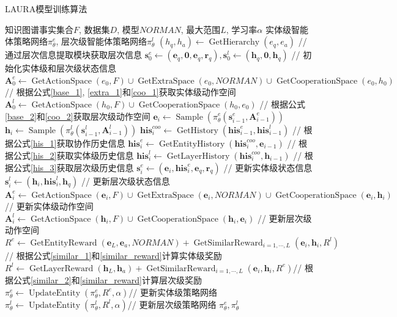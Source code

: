 \documentclass[algorithmlist, AutoFakeBold, AutoFakeSlant, figurelist, tablelist, nomlist, engineering]{seuthesix}
\begin{document}
\begin{algorithm}[H]
	\caption{LAURA模型训练算法}  
	\label{algorithm_dualagent}
	\begin{algorithmic}[1]
  \Require 知识图谱事实集合$F$, 数据集$D$, 模型$NORMAN$, 最大范围$L$, 学习率$\alpha$
  \Ensure 实体级智能体策略网络$\pi_\theta^e$, 层次级智能体策略网络$\pi_\theta^l$
  \State $(h_q, h_a) \leftarrow \operatorname{GetHierarchy}(e_q, e_a)$ // 通过层次信息提取模块获取层次信息
  \State $\bm{s}_{0}^{e} \leftarrow (\bm{e}_q, \bm{0}, \bm{e}_q, \bm{r}_q), \bm{s}_{0}^{l} \leftarrow (\bm{h}_q, \bm{0}, \bm{h}_q)$ // 初始化实体级和层次级状态信息
  \State $\bm{A}_{0}^{e} \leftarrow \operatorname{GetActionSpace}(e_0, F) \cup \operatorname{GetExtraSpace}(e_0, NORMAN) \cup \operatorname{GetCooperationSpace}(e_0, h_0)$ // 根据公式\ref{base_1}, \ref{extra_1}和\ref{coo_1}获取实体级动作空间
  \State $\bm{A}_{0}^{l} \leftarrow \operatorname{GetActionSpace}(h_0, F) \cup \operatorname{GetCooperationSpace}(h_0, e_0)$ // 根据公式\ref{base_2}和\ref{coo_2}获取层次级动作空间
  \State $\bm{e}_i \leftarrow \operatorname{Sample}(\pi_\theta^e(\bm{s}_{i-1}^{e}, \bm{A}_{i-1}^{e}))$
  \State $\bm{h}_i \leftarrow \operatorname{Sample}(\pi_\theta^l(\bm{s}_{i-1}^{l}, \bm{A}_{i-1}^{l}))$
  \State $\bm{his}_{i}^{coo} \leftarrow \operatorname{GetHistory}(\bm{his}_{i-1}^{e}, \bm{his}_{i-1}^{l})$ // 根据公式\ref{his_1}获取协作历史信息
  \State $\bm{his}_{i}^{e} \leftarrow \operatorname{GetEntityHistory}(\bm{his}_{i}^{coo}, \bm{e}_{i-1})$ // 根据公式\ref{his_2}获取实体级历史信息
  \State $\bm{his}_{i}^{l} \leftarrow \operatorname{GetLayerHistory}(\bm{his}_{i}^{coo}, \bm{h}_{i-1})$ // 根据公式\ref{his_3}获取层次级历史信息
  \State $\bm{s}_{i}^{e} \leftarrow (\bm{e}_{i}, \bm{his}_{i}^{e}, \bm{e}_q, \bm{r}_q)$ // 更新实体级状态信息
  \State $\bm{s}_{i}^{l} \leftarrow (\bm{h}_{i}, \bm{his}_{i}^{l}, \bm{h}_q)$ // 更新层次级状态信息
  \State $\bm{A}_{i}^{e} \leftarrow \operatorname{GetActionSpace}(\bm{e}_i, F) \cup \operatorname{GetExtraSpace}(\bm{e}_i, NORMAN) \cup \operatorname{GetCooperationSpace}(\bm{e}_i, \bm{h}_i)$ // 更新实体级动作空间
  \State $\bm{A}_{i}^{l} \leftarrow \operatorname{GetActionSpace}(\bm{h}_i, F) \cup \operatorname{GetCooperationSpace}(\bm{h}_i, \bm{e}_i)$ // 更新层次级动作空间
  \EndFor
  \State $R^{e} \leftarrow \operatorname{GetEntityReward}(\bm{e}_L, \bm{e}_a, NORMAN) + \operatorname{GetSimilarReward}_{i=1,\cdots,L}(\bm{e}_i, \bm{h}_i, R^{l})$// 根据公式\ref{similar_1}和\ref{similar_reward}计算实体级奖励
  \State $R^{l} \leftarrow \operatorname{GetLayerReward}(\bm{h}_L, \bm{h}_a) + \operatorname{GetSimilarReward}_{i=1,\cdots,L}(\bm{e}_i, \bm{h}_i, R^{e})$// 根据公式\ref{similar_2}和\ref{similar_reward}计算层次级奖励
  \State $\pi_\theta^e \leftarrow \operatorname{UpdateEntity}(\pi_\theta^e, R^{e}, \alpha)$// 更新实体级策略网络
  \State $\pi_\theta^l \leftarrow \operatorname{UpdateEntity}(\pi_\theta^l, R^{l}, \alpha)$// 更新层次级策略网络
  \EndFor
  \State \Return $\pi_\theta^e, \pi_\theta^l$
	\end{algorithmic}
\end{algorithm} 
\end{document}
